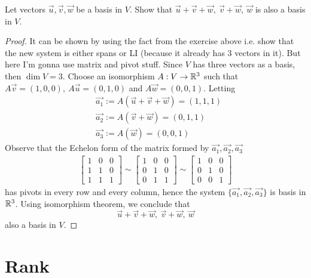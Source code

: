 \begin{exercise}
  Let vectors $\vec{u},\vec{v},\vec{w}$ be a basis in $V$. Show that
  $\vec{u}+\vec{v}+\vec{w},~\vec{v}+\vec{w},~\vec{w}$ is also
  a basis in $V$.
\end{exercise}
\begin{proof}
  It can be shown by using the fact from the exercise above
  i.e. show that the new system is either spans or LI 
  (because it already has 3 vectors in it).
  But here I'm gonna use matrix and pivot stuff. 
  Since $V$ has three vectors as a basis, then
  $\dim V=3$. Choose an isomorphism $A:V\to\R^3$ such that
  $A\vec{v}=(1,0,0),~A\vec{u}=(0,1,0)$ and $A\vec{w}=(0,0,1)$. 
  Letting
  \begin{align*}
    &\vec{a_1}:=A(\vec{u}+\vec{v}+\vec{w})=(1,1,1)\\
    &\vec{a_2}:=A(\vec{v}+\vec{w})=(0,1,1)\\
    &\vec{a_3}:=A(\vec{w})=(0,0,1)
  \end{align*}
  Observe that the Echelon form of the matrix formed by 
  $\vec{a_1},\vec{a_2},\vec{a_3}$
  \begin{align*}
    \begin{bmatrix} 1&0&0\\ 1&1&0\\ 1&1&1 \end{bmatrix}\sim
    \begin{bmatrix} 1&0&0\\ 0&1&0\\ 0&1&1 \end{bmatrix}\sim
    \begin{bmatrix} 1&0&0\\ 0&1&0\\ 0&0&1 \end{bmatrix}
  \end{align*}
  has pivots in every row and every column, hence the system
  $\{\vec{a_1},\vec{a_2},\vec{a_3}\}$ is basis in $\R^3$. Using
  isomorphism theorem, we conclude that
  \[\vec{u}+\vec{v}+\vec{w},~\vec{v}+\vec{w},~\vec{w}\]
  also a basis in $V$.
\end{proof}



\newpage
\section{Rank}

